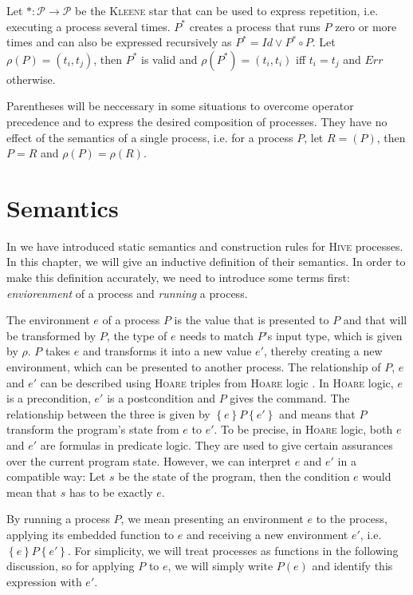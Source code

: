 Let $* \colon \mathcal{P} \to \mathcal{P}$ be the \textsc{Kleene} star that can be used to express repetition, i.e. executing a process several times. $P^*$ creates a process that runs $P$ zero or more times and can also be expressed recursively as $P^* = Id \vee P^* \circ P$. Let $\rho \left( P \right) = \left( t_i, t_j \right)$, then $P^*$ is valid and $\rho \left( P^* \right) = \left( t_i, t_i \right)$ iff $t_i = t_j$ and $Err$ otherwise.

Parentheses will be neccessary in some situations to overcome operator precedence and to express the desired composition of processes. They have no effect of the semantics of a single process, i.e. for a process $P$, let $R = \left( P \right)$, then $P = R$ and $\rho \left( P \right) = \rho \left( R \right)$.

\section{Semantics}
In  we have introduced static semantics and construction rules for \textsc{Hive} processes. In this chapter, we will give an inductive definition of their semantics. In order to make this definition accurately, we need to introduce some terms first: \textit{enviorenment} of a process and \textit{running} a process.

The environment $e$ of a process $P$ is the value that is presented to $P$ and that will be transformed by $P$, the type of $e$ needs to match $P$'s input type, which is given by $\rho$. $P$ takes $e$ and transforms it into a new value $e'$, thereby creating a new environment, which can be presented to another process. The relationship of $P$, $e$ and $e'$ can be described using \textsc{Hoare} triples from \textsc{Hoare} logic \cite{}. In \textsc{Hoare} logic, $e$ is a precondition, $e'$ is a postcondition and $P$ gives the command. The relationship between the three is given by $\left\{ e \right\} P \left\{ e' \right\}$ and means that $P$ transform the program's state from $e$ to $e'$. To be precise, in \textsc{Hoare} logic, both $e$ and $e'$ are formulas in predicate logic. They are used to give certain assurances over the current program state. However, we can interpret $e$ and $e'$ in a compatible way: Let $s$ be the state of the program, then the condition $e$ would mean that $s$ has to be exactly $e$.

By running a process $P$, we mean presenting an environment $e$ to the process, applying its embedded function to $e$ and receiving a new environment $e'$, i.e. $\left\{ e \right\} P \left\{ e' \right\}$. For simplicity, we will treat processes as functions in the following discussion, so for applying $P$ to $e$, we will simply write $P \left( e \right)$ and identify this expression with $e'$.

